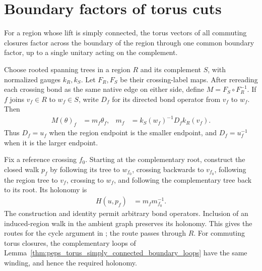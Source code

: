 \section{Boundary factors of torus cuts}%
\label{sec:peps_torus_cut_boundary_factors}

For a region whose lift is simply connected, the torus vectors of all
commuting closures factor across the boundary of the region through one
common boundary factor, up to a single unitary acting on the complement.

\begin{lemma}%
    \label{thm:peps_regular_boundary_route}
    \leanok
    Choose rooted spanning trees in a region $R$ and its complement $S$,
    with normalized gauges $k_R,k_S$. Let $F_R,F_S$ be their
    crossing-label maps. After rereading each crossing bond as the
    same native edge on either side, define $M=F_S\circ F_R^{-1}$.
    If $f$ joins $v_f\in R$ to $w_f\in S$, write $D_f$ for its
    directed bond operator from $v_f$ to $w_f$. Then
    \begin{align}
        M(\theta)_f & =m_f\theta_f,
                    & m_f           & =k_S(w_f)^{-1}D_fk_R(v_f).
        \label{eq:peps_boundary_route_multiplier}
    \end{align}
    Thus $D_f=u_f$ when the region endpoint is the smaller endpoint,
    and $D_f=u_f^{-1}$ when it is the larger endpoint.

    Fix a reference crossing $f_0$. Starting at the complementary root,
    construct the closed walk $p_f$ by following its tree to
    $w_{f_0}$, crossing backwards to $v_{f_0}$, following the region tree
    to $v_f$, crossing to $w_f$, and following the complementary tree
    back to its root. Its holonomy is
    \begin{align}
        H(u,p_f) & =m_fm_{f_0}^{-1}.
    \end{align}
    The construction and identity permit arbitrary bond operators.
    Inclusion of an induced-region walk in the ambient graph preserves
    its holonomy. This gives the routes for the cycle argument in
    \cite[Theorem~6.9]{Schuch2010PEPS}; the route passes through $R$.
    For commuting torus closures, the complementary loops of
    Lemma~\ref{thm:peps_torus_simply_connected_boundary_loops} have
    the same winding, and hence the required holonomy.
\end{lemma}

